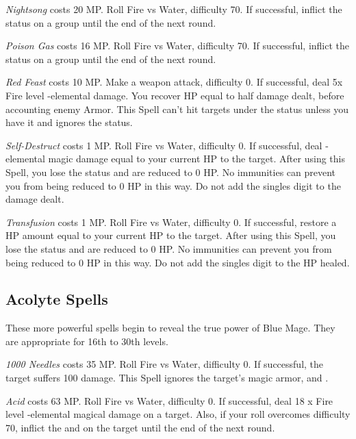 \begin{multicols}{2}
    \textit{Nightsong} costs 20 MP. Roll Fire vs Water, difficulty 70. If successful, inflict the  status on a group until the end of the next round.
    
    \textit{Poison Gas} costs 16 MP. Roll Fire vs Water, difficulty 70. If successful, inflict the  status on a group until the end of the next round.
    
    \textit{Red Feast} costs 10 MP. Make a weapon attack, difficulty 0. If successful, deal 5x Fire level -elemental damage. You recover HP equal to half damage dealt, before accounting enemy Armor. This Spell can’t hit targets under the  status unless you have it and ignores the  status.
    
    \textit{Self-Destruct} costs 1 MP. Roll Fire vs Water, difficulty 0. If successful, deal -elemental magic damage equal to your current HP to the target. After using this Spell, you lose the  status and are reduced to 0 HP. No immunities can prevent you from being reduced to 0 HP in this way. Do not add the singles digit to the damage dealt.

    \textit{Transfusion} costs 1 MP. Roll Fire vs Water, difficulty 0. If successful, restore a HP amount equal to your current HP to the target. After using this Spell, you lose the  status and are reduced to 0 HP. No immunities can prevent you from being reduced to 0 HP in this way. Do not add the singles digit to the HP healed.
    
\subsection{Acolyte Spells}
    
These more powerful spells begin to reveal the true power of Blue Mage. They are appropriate for 16th to 30th levels.

    \textit{1000 Needles} costs 35 MP. Roll Fire vs Water, difficulty 0. If successful, the target suffers 100 damage. This Spell ignores the target’s magic armor,  and .

    \textit{Acid} costs 63 MP. Roll Fire vs Water, difficulty 0. If successful, deal 18 x Fire level -elemental magical damage on a target. Also, if your roll overcomes difficulty 70, inflict the  and  on the target until the end of the next round.
    

\end{multicols}
